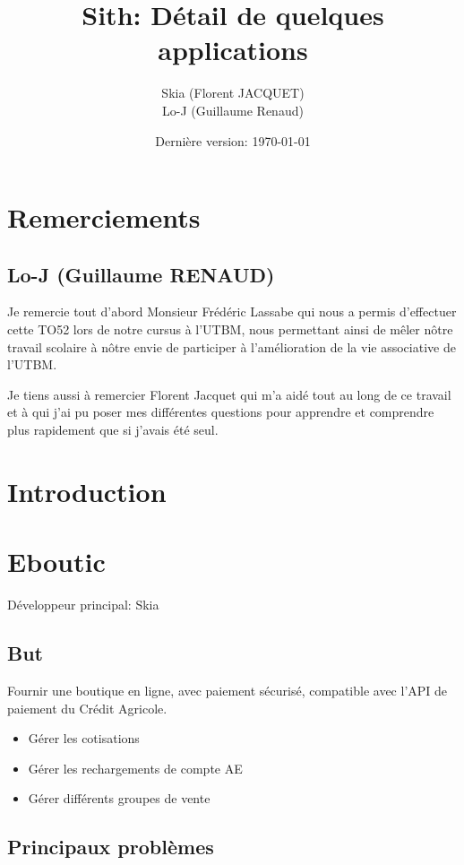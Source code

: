 \documentclass[a4paper]{report}
\title{Sith: Détail de quelques applications}
\author{Skia (Florent JACQUET)\\
Lo-J (Guillaume Renaud)}
\date{Dernière version: \today}
\begin{document}
\maketitle

\tableofcontents

\chapter{Remerciements}
\section{Lo-J (Guillaume RENAUD)}
\par Je remercie tout d’abord Monsieur Frédéric Lassabe qui nous a permis d’effectuer cette TO52 lors de notre cursus à l’UTBM, nous permettant ainsi de mêler nôtre travail scolaire à nôtre envie de participer à l’amélioration de la vie associative de l’UTBM.

\par Je tiens aussi à remercier Florent Jacquet qui m’a aidé tout au long de ce travail et à qui j’ai pu poser mes différentes questions pour apprendre et comprendre plus rapidement que si j’avais été seul.


\chapter{Introduction}

\chapter{Eboutic}
\label{sec:eboutic}
\par Développeur principal: Skia

\section{But}
\label{sub:but}
\par Fournir une boutique en ligne, avec paiement sécurisé, compatible avec l'API de paiement du Crédit Agricole.
\begin{itemize}
    \item Gérer les cotisations
    \item Gérer les rechargements de compte AE
    \item Gérer différents groupes de vente
\end{itemize}

\section{Principaux problèmes}
\label{sec:principaux_problemes}
\end{document}
